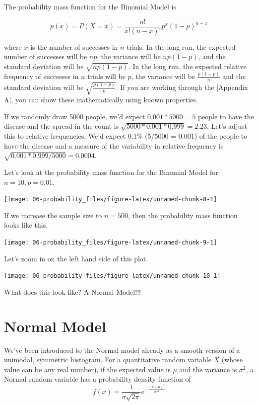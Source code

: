 \documentclass[
]{book}
\begin{document}
The probability mass function for the Binomial Model is

\[p(x) = P(X = x) = \frac{n!}{x!(n-x)!}p^x(1-p)^{n-x}\]

where \(x\) is the number of successes in \(n\) trials. In the long run, the expected number of successes will be \(np\), the variance will be \(np(1-p)\), and the standard deviation will be \(\sqrt{np(1-p)}\). In the long run, the expected relative frequency of successes in \(n\) trials will be \(p\), the variance will be \(\frac{p(1-p)}{n}\) and the standard deviation will be \(\sqrt{\frac{p(1-p)}{n}}\). If you are working through the {[}Appendix A{]}, you can show these mathematically using known properties.

If we randomly draw 5000 people, we'd expect \(0.001*5000 = 5\) people to have the disease and the spread in the count is \(\sqrt{5000*0.001*0.999} = 2.23\). Let's adjust this to relative frequencies. We'd expect 0.1\% (5/5000 = 0.001) of the people to have the disease and a measure of the variability in relative frequency is \(\sqrt{0.001*0.999/5000} = 0.0004\).

Let's look at the probability mass function for the Binomial Model for \(n = 10, p = 0.01\).

\begin{center}\texttt{[image: 06-probability\_files/figure-latex/unnamed-chunk-8-1]} \end{center}

If we increase the sample size to \(n = 500\), then the probability mass function looks like this.

\begin{center}\texttt{[image: 06-probability\_files/figure-latex/unnamed-chunk-9-1]} \end{center}

Let's zoom in on the left hand side of this plot.

\begin{center}\texttt{[image: 06-probability\_files/figure-latex/unnamed-chunk-10-1]} \end{center}

What does this look like? A Normal Model!!!

\section{Normal Model}\label{normal-model}

We've been introduced to the Normal model already as a smooth version of a unimodal, symmetric histogram. For a quantitative random variable \(X\) (whose value can be any real number), if the expected value is \(\mu\) and the variance is \(\sigma^2\), a Normal random variable has a probability density function of
\[f(x) =  \frac{1}{\sigma\sqrt{2\pi}}e^{-\frac{(x-\mu)^2}{2\sigma^2}}\]
\end{document}
